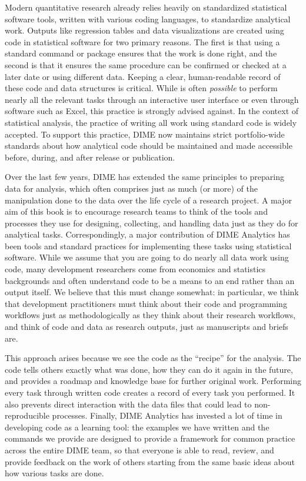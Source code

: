Modern quantitative research already relies heavily
on standardized statistical software tools,
written with various coding languages, to standardize analytical work.
Outputs like regression tables and data visualizations
are created using code in statistical software for two primary reasons.
The first is that using a standard command or package ensures that the work is done right,
and the second is that it ensures the same procedure can be confirmed or checked
at a later date or using different data.
Keeping a clear, human-readable record of these code and data structures is critical.
While is often \textit{possible} to perform nearly all the relevant tasks
through an interactive user interface or even through software such as Excel,
this practice is strongly advised against.
In the context of statistical analysis,
the practice of writing all work using standard code is widely accepted.
To support this practice, DIME now maintains strict portfolio-wide standards
about how analytical code should be maintained and made accessible
before, during, and after release or publication.

Over the last few years, DIME has extended the same principles to preparing data for analysis,
which often comprises just as much (or more) of the manipulation done to the data
over the life cycle of a research project.
A major aim of this book is to encourage research teams
to think of the tools and processes they use
for designing, collecting, and handling data
just as they do for analytical tasks.
Correspondingly, a major contribution of DIME Analytics
has been tools and standard practices
for implementing these tasks using statistical software.
While we assume that you are going to do nearly all data work using code,
many development researchers come from economics and statistics backgrounds
and often understand code to be a means to an end rather than an output itself.
We believe that this must change somewhat:
in particular, we think that development practitioners
must think about their code and programming workflows
just as methodologically as they think about their research workflows,
and think of code and data as research outputs, just as manuscripts and briefs are.

This approach arises because we see the code as the ``recipe'' for the analysis.
The code tells others exactly what was done,
how they can do it again in the future,
and provides a roadmap and knowledge base for further original work.\cite{hamermesh2007replication}
Performing every task through written code
creates a record of every task you performed.\cite{ozier2019replication}
It also prevents direct interaction
with the data files that could lead to non-reproducible processes.\cite{chang2015economics}
Finally, DIME Analytics has invested a lot of time in developing code as a learning tool:
the examples we have written and the commands we provide
are designed to provide a framework for common practice
across the entire DIME team, so that everyone is able to
read, review, and provide feedback on the work of others
starting from the same basic ideas about how various tasks are done.

